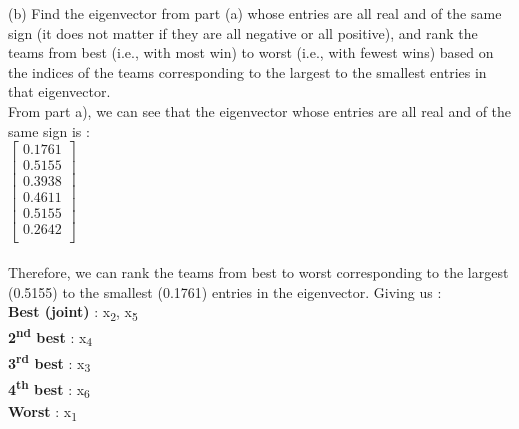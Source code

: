 \documentclass{report}
\begin{document}
    (b) Find the eigenvector from part (a) whose entries are all real and of the same sign (it does not matter if they are all negative or all positive), and rank the teams from best 
        (i.e., with most win) to worst (i.e., with fewest wins) based on the indices of the teams corresponding to the largest to the smallest entries in that eigenvector. \\

        From part a), we can see that the eigenvector whose entries are all real and of the same sign is :\\
        {$\begin{bmatrix}
            0.1761 \\
            0.5155 \\
            0.3938 \\
            0.4611 \\
            0.5155 \\
            0.2642 \\
        \end{bmatrix}$}\\\\
        Therefore, we can rank the teams from best to worst corresponding to the largest (0.5155) to the smallest (0.1761) entries in the eigenvector. Giving us :\\
        \textbf{Best (joint)} : x\textsubscript{2}, x\textsubscript{5}\\
        \textbf{2\textsuperscript{nd} best} : x\textsubscript{4}\\
        \textbf{3\textsuperscript{rd} best} : x\textsubscript{3}\\
        \textbf{4\textsuperscript{th} best} : x\textsubscript{6}\\
        \textbf{Worst} : x\textsubscript{1}\\


    

\end{document}
